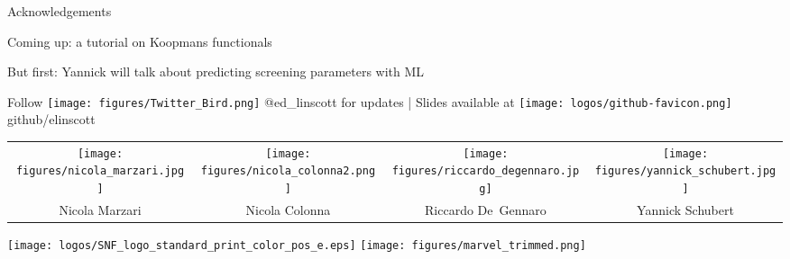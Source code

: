 \documentclass[xcolor=table,aspectratio=169]{beamer}
\numberwithin{equation}{section}
\begin{document}
\begin{frame}{Acknowledgements}

   \begin{center}
      Coming up: a tutorial on Koopmans functionals
      \vspace{1em}

      But first: Yannick will talk about predicting screening parameters with ML

      \vspace{1em}
      Follow \texttt{[image: figures/Twitter\_Bird.png]} \textcolor{twitter_blue}{@ed\_linscott} for updates | Slides available at \texttt{[image: logos/github-favicon.png]} github/elinscott
   \end{center}

   \vspace{1ex}

   \begin{center}
      \footnotesize
      \begin{tabularx}{0.7\textwidth}{CCCC}
         \texttt{[image: figures/nicola\_marzari.jpg]}     &
         \texttt{[image: figures/nicola\_colonna2.png]}    &
         \texttt{[image: figures/riccardo\_degennaro.jpg]} &
         \texttt{[image: figures/yannick\_schubert.jpg]}     \\
         Nicola Marzari                                                             &
         Nicola Colonna                                                             &
         Riccardo De~Gennaro                                                        &
         Yannick Schubert                                                             \\
      \end{tabularx}
   \end{center}
   \begin{center}
      \texttt{[image: logos/SNF\_logo\_standard\_print\_color\_pos\_e.eps]}
      \hspace{1em}
      \texttt{[image: figures/marvel\_trimmed.png]}
   \end{center}

   \vspace{2ex}
   \scriptsize


   \vspace{2ex}
   \scriptsize
\end{frame}
\end{document}

